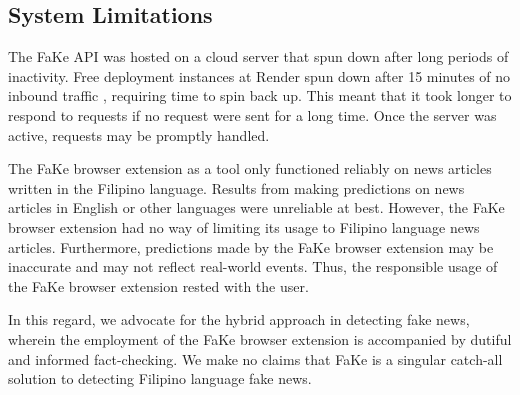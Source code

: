 \subsection{System Limitations}

The FaKe API was hosted on a cloud server that spun down after long periods of inactivity. Free deployment instances at Render spun down after 15 minutes of no inbound traffic \cite{render-docs}, requiring time to spin back up. This meant that it took longer to respond to requests if no request were sent for a long time. Once the server was active, requests may be promptly handled.

The FaKe browser extension as a tool only functioned reliably on news articles written in the Filipino language. Results from making predictions on news articles in English or other languages were unreliable at best. However, the FaKe browser extension had no way of limiting its usage to Filipino language news articles. Furthermore, predictions made by the FaKe browser extension may be inaccurate and may not reflect real-world events. Thus, the responsible usage of the FaKe browser extension rested with the user.

In this regard, we advocate for the hybrid approach in detecting fake news, wherein the employment of the FaKe browser extension is accompanied by dutiful and informed fact-checking. We make no claims that FaKe is a singular catch-all solution to detecting Filipino language fake news.